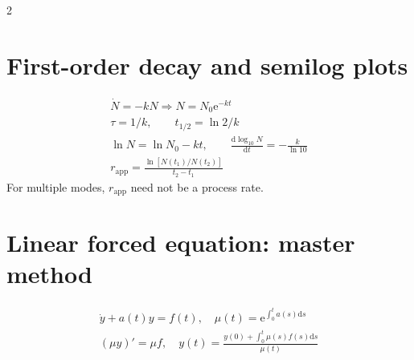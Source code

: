 \documentclass[10pt,a4paper]{scrartcl}
\newcommand{\dd}{\mathrm{d}}
\newcommand{\ee}{\mathrm{e}}
\begin{document}
\begin{multicols}{2}
\section*{First-order decay and semilog plots}
\begin{gather*}
\dot N=-kN\Rightarrow N=N_0\ee^{-kt}\\
\tau=1/k,\qquad t_{1/2}=\ln2/k\\
\ln N=\ln N_0-kt,\qquad
\frac{\dd\log_{10}N}{\dd t}=-\frac{k}{\ln10}\\
r_{\mathrm{app}}=\frac{\ln[N(t_1)/N(t_2)]}{t_2-t_1}
\end{gather*}
For multiple modes, $r_{\mathrm{app}}$ need not be a process rate.

\section*{Linear forced equation: master method}
\begin{gather*}
\dot y+a(t)y=f(t),\quad \mu(t)=\ee^{\int_0^t a(s)\dd s}\\
(\mu y)'=\mu f,\quad
y(t)=\frac{y(0)+\int_0^t\mu(s)f(s)\dd s}{\mu(t)}
\end{gather*}


\end{multicols}
\end{document}
